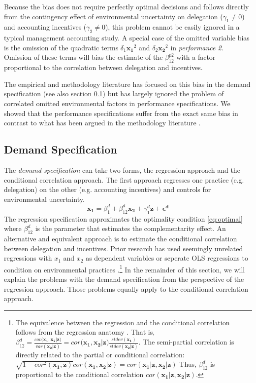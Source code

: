 \documentclass[12pt]{article}
\begin{document}
Because the bias does not require perfectly optimal decisions and follows directly from the contingency effect of environmental uncertainty on delegation ($\gamma_1 \neq 0$) and accounting incentives ($\gamma_2 \neq 0$), this problem cannot be easily ignored in a typical management accounting study. A special case of the omitted variable bias is the omission of the quadratic terms $\delta_1 \mathbf{x_1}^2$ and $\delta_2 \mathbf{x_2}^2$ in \emph{performance 2}. Omission of these terms will bias the estimate of the $\beta^{p2}_{12}$ with a factor proportional to the correlation between delegation and incentives.

The empirical and methodology literature has focused on this bias in the demand specification (see also section \ref{demand-specification}) but has largely ignored the problem of correlated omitted environmental factors in performance specifications. We showed that the performance specifications suffer from the exact same bias in contrast to what has been argued in the methodology literature \citep{carree_note_2011}. 

\subsection{Demand Specification}\label{demand-specification}

The \emph{demand specification} can take two forms, the regression approach and the conditional correlation approach. The first approach regresses one practice (e.g. delegation) on the other (e.g. accounting incentives) and controls for environmental uncertainty.
\begin{equation*} 
\mathbf{x_1} = \beta_1^d + \beta_{12}^d \mathbf{x_2} 
        + \gamma_{1}^d \mathbf{z}
        + \mathbf{\epsilon^d}
\end{equation*}
The regression specification approximates the optimality condition \eqref{eq:optimal} where \(\beta^d_{12}\) is the parameter that estimates the complementarity effect. An alternative and equivalent approach is to estimate the conditional correlation between delegation and incentives. Prior research has used seemingly unrelated regressions with $x_1$ and $x_2$ as dependent variables or seperate OLS regressions to condition on environmental practices \citep{indjejikian_accounting_2012, matejka_balancing_2017}.\footnote{The equivalence between the regression and the conditional correlation follows from the regression anatomy \citep{angrist2008mostly}. That is, $\beta^d_{12}=\frac{cov(\mathbf{x_1}, \mathbf{x_2|z)}}{var (\mathbf{x_2|z})}=cor(\mathbf{x_1}, \mathbf{x_2|z)}\frac{stdev(\mathbf{x_1})}{stdev (\mathbf{x_2|z})}$. The semi-partial correlation is directly related to the partial or conditional correlation: $\sqrt{1 - cor^2(\mathbf{x_1}, \mathbf{z})} cor(\mathbf{x_1}, \mathbf{x_2|z}) = cor(\mathbf{x_1|z}, \mathbf{x_2|z})$
Thus, $\beta^d_{12}$ is proportional to the conditional correlation $cor(\mathbf{x_1|z}, \mathbf{x_2|z})$.} In the remainder of this section, we will explain the problems with the demand specification from the perspective of the regression approach. Those problems equally apply to the conditional correlation approach.  
\end{document}
